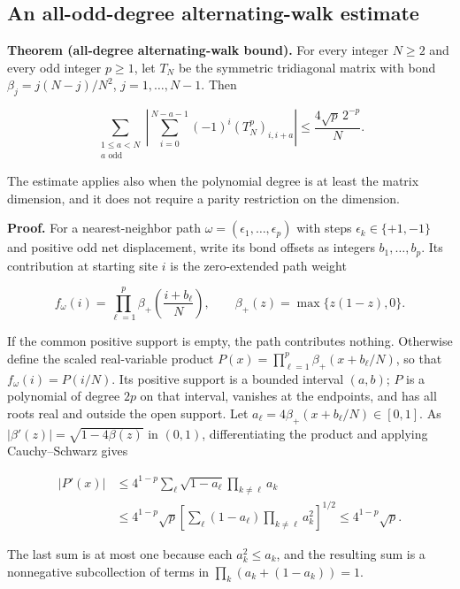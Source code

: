 \documentclass[
  10pt,
  a4paper,
]{article}
\begin{document}
\subsection{An all-odd-degree alternating-walk estimate}\label{an-all-odd-degree-alternating-walk-estimate}

\textbf{Theorem (all-degree alternating-walk bound).} For every integer \(N\ge 2\) and every odd integer \(p\ge 1\), let \(T_N\) be the symmetric tridiagonal matrix with bond \(\beta_j=j(N-j)/N^2\), \(j=1,\ldots ,N-1\). Then

\[
\boxed{\displaystyle
\sum_{\substack{1\le a<N\\a\text{ odd}}}
\left|\sum_{i=0}^{N-a-1}(-1)^i(T_N^p)_{i,i+a}\right|
\le \frac{4\sqrt p\,2^{-p}}{N}. }
\tag{S1}
\]

The estimate applies also when the polynomial degree is at least the matrix dimension, and it does not require a parity restriction on the dimension.

\textbf{Proof.} For a nearest-neighbor path \(\omega=(\epsilon_1,\ldots ,\epsilon_p)\) with steps \(\epsilon_k \in \{+1,-1\}\) and positive odd net displacement, write its bond offsets as integers \(b_1,\ldots ,b_p\). Its contribution at starting site \(i\) is the zero-extended path weight

\[
 f_\omega(i)=\prod_{\ell=1}^p\beta_+\!\left(\frac{i+b_\ell}{N}\right),\qquad
\beta_+(z)=\max\{z(1-z),0\}.
\]

If the common positive support is empty, the path contributes nothing. Otherwise define the scaled real-variable product \(P(x)=\prod_{\ell=1}^p\beta_+(x+b_\ell/N)\), so that \(f_\omega(i)=P(i/N)\). Its positive support is a bounded interval \((a,b)\); \(P\) is a polynomial of degree \(2p\) on that interval, vanishes at the endpoints, and has all roots real and outside the open support. Let \(a_\ell=4 \beta_+(x+b_\ell/N) \in [0,1]\). As \(|\beta'(z)|=\sqrt{1-4 \beta(z)}\) in \((0,1)\), differentiating the product and applying Cauchy--Schwarz gives

\[
\begin{aligned}
 |P'(x)|
 &\le 4^{1-p}\sum_\ell\sqrt{1-a_\ell}
       \prod_{k\ne\ell}a_k\\
 &\le4^{1-p}\sqrt p\left[
   \sum_\ell(1-a_\ell)\prod_{k\ne\ell}a_k^2\right]^{1/2}
 \le4^{1-p}\sqrt p.
\end{aligned}
\tag{S2}
\]

The last sum is at most one because each \(a_k^2\le a_k\), and the resulting sum is a nonnegative subcollection of terms in \(\prod_k(a_k+(1-a_k))=1\).
\end{document}
